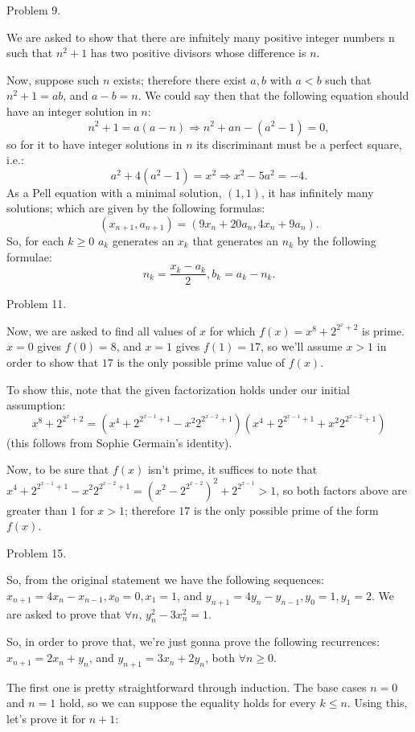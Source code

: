 \documentclass[12pt]{minimal}
\begin{document}
	Problem 9.

	We are asked to show that there are infnitely many
	positive integer numbers n such that $n^2 + 1$ has two
	positive divisors whose difference is $n$.

	Now, suppose such $n$ exists; therefore there exist
	$a, b$ with $a < b$ such that $n^2 + 1 = ab$, and
	$a - b = n$. We could say then that the following
	equation should have an integer solution in $n$:
	$$
		n^2 + 1 = a(a - n) \Rightarrow n^2 +an - (a^2 - 1) = 0,
	$$
	so for it to have integer solutions in $n$ its discriminant
	must be a perfect square, i.e.:
	$$
		a^2 + 4(a^2 - 1) = x^2 \Rightarrow x^2 - 5a^2 = -4.
	$$
	As a Pell equation with a minimal solution, $(1, 1)$, it
	has infinitely many solutions; which are given by the
	following formulas:
	$$
		(x_{n + 1}, a_{n + 1}) = (9x_n + 20a_n, 4x_n + 9a_n).
	$$	
	So, for each $k \geq 0$ $a_k$ generates an $x_k$ that
	generates an $n_k$ by the following formulae:
	$$
		n_k = \frac{x_k - a_k}{2}, b_k = a_k - n_k.
	$$

	Problem 11.

	Now, we are asked to find all values of $x$ for which
	$f(x) = x^8 + 2^{2^x + 2}$ is prime. $x = 0$ gives
	$f(0) = 8$, and $x = 1$ gives $f(1) = 17$, so we'll assume
	$x > 1$ in order to show that $17$ is the only possible
	prime value of $f(x)$.

	To show this, note that the given factorization holds
	under our initial assumption:
	$$ x^8 + 2^{2^x + 2} =
	(x^4 + 2^{2^{x - 1} + 1} - x^2 2^{2^{x - 2} + 1})
	(x^4 + 2^{2^{x - 1} + 1} + x^2 2^{2^{x - 2} + 1})$$
	(this follows from Sophie Germain's identity).

	Now, to be sure that $f(x)$ isn't prime, it suffices to
	note that
	$
		x^4 + 2^{2^{x - 1} + 1} - x^2 2^{2^{x - 2} + 1} =
		(x^2 - 2^{2^{x - 2}})^2 + 2^{2^{x - 1}} > 1
	$, so both factors above are greater than $1$ for $x > 1$;
	therefore $17$ is the only possible prime of the form
	$f(x)$.

	Problem 15.

	So, from the original statement we have the following
	sequences:
	$x_{n + 1} = 4x_{n} - x_{n - 1}, x_0 = 0, x_1 = 1$, and
	$y_{n + 1} = 4y_{n} - y_{n - 1}, y_0 = 1, y_1 = 2$. We
	are asked to prove that
	$\forall n$, $y_{n}^2 - 3x_{n}^2 = 1$.

	So, in order to prove that, we're just gonna prove the
	following recurrences:
	$x_{n + 1} = 2x_n + y_n$, and $y_{n + 1} = 3x_n + 2y_n$,
	both $\forall n \geq 0$.

	The first one is pretty straightforward through induction.
	The base cases $n = 0$ and $n = 1$ hold, so we can suppose
	the equality holds for every $k \leq n$. Using this, let's
	prove it for $n + 1$:
\end{document}
